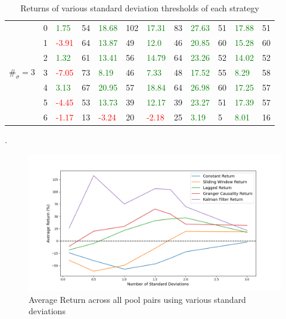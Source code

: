 \begin{table}[!htb]
\begin{adjustwidth}{-0.8in}{-0.9in}
\begin{tabular}{|p{4em}|p{2em}|p{3em}|p{3em}|p{3em}|p{3em}|p{3em}|p{3em}|p{3em}|p{3em}|p{3em}|p{3em}|}
            
            & 0 & \textcolor{green}{1.75} & 54 & \textcolor{green}{18.68} & 102 & \textcolor{green}{17.31} & 83 & \textcolor{green}{27.63} & 51 & \textcolor{green}{17.88} & 51\\\cline{3-12}
            & 1 & \textcolor{red}{-3.91} & 64 & \textcolor{green}{13.87} & 49 & \textcolor{green}{12.0} & 46 & \textcolor{green}{20.85} & 60 & \textcolor{green}{15.28} & 60\\\cline{3-12}
            & 2 & \textcolor{green}{1.32} & 61 & \textcolor{green}{13.41} & 56 & \textcolor{green}{14.79} & 64 & \textcolor{green}{23.26} & 52 & \textcolor{green}{14.02} & 52\\\cline{3-12}
            $\#_{\sigma}=3$ & 3 & \textcolor{red}{-7.05} & 73 & \textcolor{green}{8.19} & 46 & \textcolor{green}{7.33} & 48 & \textcolor{green}{17.52} & 55 & \textcolor{green}{8.29} & 58\\\cline{3-12}
            & 4 & \textcolor{green}{3.13} & 67 & \textcolor{green}{20.95} & 57 & \textcolor{green}{18.84} & 64 & \textcolor{green}{26.98} & 60 & \textcolor{green}{17.25} & 57\\\cline{3-12}
            & 5 & \textcolor{red}{-4.45} & 53 & \textcolor{green}{13.73} & 39 & \textcolor{green}{12.17} & 39 & \textcolor{green}{23.27} & 51 & \textcolor{green}{17.39} & 57\\\cline{3-12}
            & 6 & \textcolor{red}{-1.17} & 13 & \textcolor{red}{-3.24} & 20 & \textcolor{red}{-2.18} & 25 & \textcolor{green}{3.19} & 5 & \textcolor{green}{8.01} & 16\\\hline
        \end{tabular}
    \end{adjustwidth}
    \caption{Returns of various standard deviation thresholds of each strategy \label{tab:varying_sigma}}.
\end{table}

\begin{figure}[h!]
    \centering
    \includegraphics[width=1\textwidth]{evaluation/Images/VaryStd.png}
    \caption{Average Return across all pool pairs using various standard deviations}
    \label{fig:varyStd}
\end{figure}

